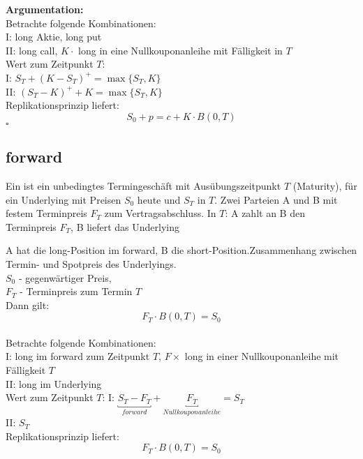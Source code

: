 \textbf{Argumentation:} \\
Betrachte folgende Kombinationen:\\
I: long Aktie, long put\\
II: long call, $K \cdot $ long in eine Nullkouponanleihe mit Fälligkeit in $T$\\

Wert zum Zeitpunkt $T$: \\
I: $S_T + (K-S_T)^+ = \max\{S_T,K\}$ \\
II: $(S_T - K)^+ + K = \max\{S_T,K\}$ \\

Replikationsprinzip liefert:
\[
	S_0 + p = c + K \cdot B(0,T)
\]
\hfill $\square$


\subsection{forward} %
\label{sub:forward}

Ein  ist ein unbedingtes Termingeschäft mit Ausübungszeitpunkt $T$ (Maturity), für ein Underlying mit Preisen $S_0$ heute und $S_T$ in $T$. Zwei Parteien A und B mit festem Terminpreis $F_T$ zum Vertragsabschluss. In $T$: A zahlt an B den Terminpreis $F_T$, B liefert das Underlying

A hat die long-Position im forward, B die short-Position.Zusammenhang zwischen Termin- und Spotpreis des Underlyings.\\
\hspace{2cm} $S_0$ - gegenwärtiger Preis, \\
\hspace{2cm} $F_T$ - Terminpreis zum Termin $T$\\
Dann gilt:
\[ F_T \cdot B(0,T) = S_0\]
\\
Betrachte folgende Kombinationen:\\
I: long im forward zum Zeitpunkt $T$, $F \times$ long in einer Nullkouponanleihe mit Fälligkeit $T$\\
II: long im Underlying\\
Wert zum Zeitpunkt $T$:
I: $\underbracket{S_T - F_T}_{forward} + \underbracket{F_T}_{Nullkouponanleihe} = S_T$\\
II: $S_T$\\
Replikationsprinzip liefert:
\[F_T \cdot B(0,T) = S_0 \]


